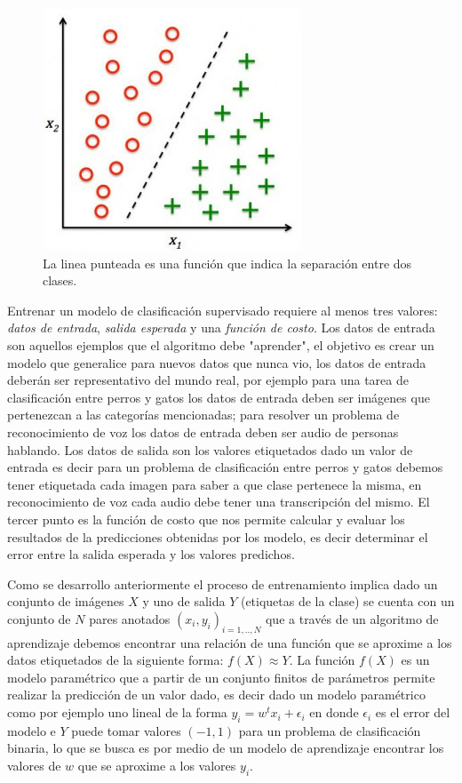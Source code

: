 \begin{figure}[H] \centering
  \includegraphics[scale=0.4,keepaspectratio=true,clip=true]{imagenes/MarcoTeorico/classification.jpg}
  \caption{La linea punteada es una función que indica la separación entre dos clases.}\label{Fig:clasificacion}
\end{figure}

Entrenar un modelo de clasificación supervisado requiere al menos tres valores:  \textit{datos de entrada}, \textit{salida esperada} y una \textit{función de costo}.  Los datos de entrada son aquellos ejemplos que el algoritmo debe "aprender", el objetivo es crear un modelo que generalice para nuevos datos que nunca vio, los datos de entrada deberán ser representativo del mundo real, por ejemplo para una tarea de clasificación entre perros y gatos los datos de entrada deben ser imágenes que pertenezcan a las categorías mencionadas; para resolver un problema de reconocimiento de voz los datos de entrada deben ser audio de personas hablando. Los datos de salida son los valores etiquetados dado un valor de entrada es decir para un problema de clasificación entre perros y gatos debemos tener etiquetada cada imagen para saber a que clase pertenece la misma, en reconocimiento de voz cada audio debe tener una transcripción del mismo. El tercer punto es la función de costo que nos permite calcular y evaluar  los resultados de la predicciones obtenidas por los modelo, es decir determinar el error entre la salida esperada y los valores predichos.

Como se desarrollo anteriormente el proceso de entrenamiento implica dado un conjunto de imágenes $X$ y uno de salida $Y$ (etiquetas de la clase) se cuenta con un conjunto de $N$ pares anotados ${(x_i, y_i)}_{i=1,..,N}$  que a través de un algoritmo de aprendizaje debemos encontrar una relación de una función que se aproxime a los datos etiquetados de la siguiente forma: $f(X) ≈ Y$. La función $f(X)$ es un modelo paramétrico que a partir de un conjunto finitos de parámetros permite realizar la predicción de un valor dado, es decir dado un modelo paramétrico como por ejemplo uno lineal de la forma $y_i = w^t x_i + \epsilon_i$ en donde $\epsilon_i$ es el error del modelo e $Y$ puede tomar valores $(-1,1)$ para un problema de clasificación binaria, lo que se busca es por medio de un modelo de aprendizaje encontrar los valores de  $w$ que se aproxime a los valores $y_i$.
 


